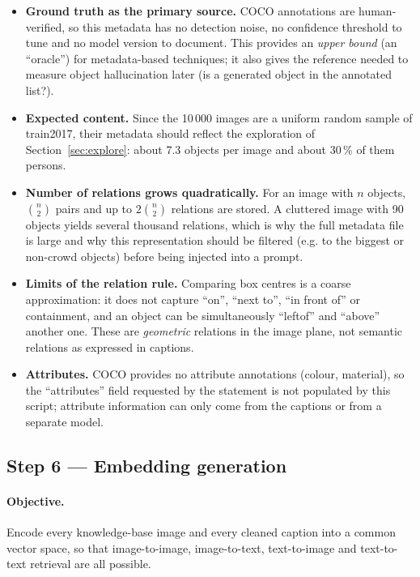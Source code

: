 \documentclass[11pt,a4paper]{article}
\renewcommand{\_}{\textunderscore\allowbreak{}}
\begin{document}
\begin{interp}
\begin{itemize}[nosep]
  \item \textbf{Ground truth as the primary source.} COCO annotations are human-verified, so this metadata has no detection noise, no confidence threshold to tune and no model version to document. This provides an \emph{upper bound} (an ``oracle'') for metadata-based techniques; it also gives the reference needed to measure object hallucination later (is a generated object in the annotated list?).
  \item \textbf{Expected content.} Since the 10\,000 images are a uniform random sample of train2017, their metadata should reflect the exploration of Section~\ref{sec:explore}: about 7.3 objects per image and about 30\,\% of them persons.
  \item \textbf{Number of relations grows quadratically.} For an image with $n$ objects, $\binom{n}{2}$ pairs and up to $2\binom{n}{2}$ relations are stored. A cluttered image with 90 objects yields several thousand relations, which is why the full metadata file is large and why this representation should be filtered (e.g. to the biggest or non-crowd objects) before being injected into a prompt.
  \item \textbf{Limits of the relation rule.} Comparing box centres is a coarse approximation: it does not capture ``on'', ``next to'', ``in front of'' or containment, and an object can be simultaneously ``left\_of'' and ``above'' another one. These are \emph{geometric} relations in the image plane, not semantic relations as expressed in captions.
  \item \textbf{Attributes.} COCO provides no attribute annotations (colour, material), so the ``attributes'' field requested by the statement is not populated by this script; attribute information can only come from the captions or from a separate model.
\end{itemize}
\end{interp}





\subsection{Step 6 --- Embedding generation}
\label{sec:embeddings}

\paragraph{Objective.} Encode every knowledge-base image and every cleaned caption into a common vector space, so that image-to-image, image-to-text, text-to-image and text-to-text retrieval are all possible.
\end{document}

